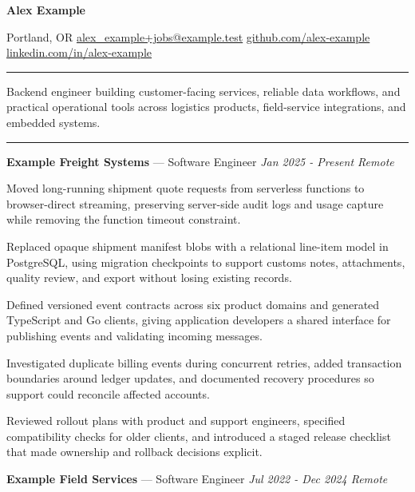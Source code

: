 \documentclass[10pt,letterpaper]{article}
\newcommand{\jtsection}[1]{\par\vspace{5pt}{\fontsize{11.5pt}{13pt}\selectfont\bfseries #1}\par\nobreak\vspace{1.5pt}\hrule\vspace{3pt}\nobreak}
\newenvironment{jtitems}
  {\begin{list}{\textbullet}{\setlength{\leftmargin}{12pt}\setlength{\labelwidth}{6pt}\setlength{\labelsep}{6pt}\setlength{\itemsep}{1pt}\setlength{\parsep}{0pt}\setlength{\topsep}{2pt}\setlength{\partopsep}{0pt}}}
  {\end{list}}
\begin{document}
\fontsize{10.5pt}{12pt}\selectfont
{\fontsize{20pt}{22pt}\selectfont\bfseries Alex Example}\par\vspace{2pt}
Portland, OR \textperiodcentered{} \href{mailto:alex\_example+jobs@example.test}{alex\_example+jobs@example.test} \textperiodcentered{} \href{https://github.com/alex-example}{github.com/alex-example} \textperiodcentered{} \href{https://www.linkedin.com/in/alex-example}{linkedin.com/in/alex-example}\par
\jtsection{Summary}
Backend engineer building customer-facing services, reliable data workflows, and practical operational tools across logistics products, field-service integrations, and embedded systems.\par
\jtsection{Experience}
\textbf{Example Freight Systems} --- Software Engineer \textperiodcentered{} \textit{Jan 2025 - Present \textperiodcentered{} Remote}\par\nopagebreak[3]
\begin{jtitems}
\item Moved long-running shipment quote requests from serverless functions to browser-direct streaming, preserving server-side audit logs and usage capture while removing the function timeout constraint.
\item Replaced opaque shipment manifest blobs with a relational line-item model in PostgreSQL, using migration checkpoints to support customs notes, attachments, quality review, and export without losing existing records.
\item Defined versioned event contracts across six product domains and generated TypeScript and Go clients, giving application developers a shared interface for publishing events and validating incoming messages.
\item Investigated duplicate billing events during concurrent retries, added transaction boundaries around ledger updates, and documented recovery procedures so support could reconcile affected accounts.
\item Reviewed rollout plans with product and support engineers, specified compatibility checks for older clients, and introduced a staged release checklist that made ownership and rollback decisions explicit.
\end{jtitems}
\vspace{2pt}
\textbf{Example Field Services} --- Software Engineer \textperiodcentered{} \textit{Jul 2022 - Dec 2024 \textperiodcentered{} Remote}\par\nopagebreak[3]
\end{document}
